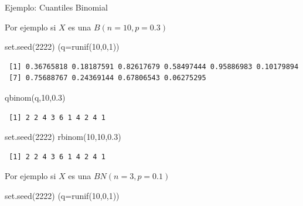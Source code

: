 \documentclass[
  letterpaper,
  DIV=11,
  numbers=noendperiod]{scrreprt}
\newenvironment{Shaded}{\begin{snugshade}}{\end{snugshade}}
\newcommand{\AttributeTok}[1]{\textcolor[rgb]{0.40,0.45,0.13}{#1}}
\newcommand{\DecValTok}[1]{\textcolor[rgb]{0.68,0.00,0.00}{#1}}
\newcommand{\FloatTok}[1]{\textcolor[rgb]{0.68,0.00,0.00}{#1}}
\newcommand{\FunctionTok}[1]{\textcolor[rgb]{0.28,0.35,0.67}{#1}}
\newcommand{\NormalTok}[1]{\textcolor[rgb]{0.00,0.23,0.31}{#1}}
\begin{document}
\begin{Ejemplo}{Ejemplo: Cuantiles Binomial}{}

Por ejemplo si \(X\) es una \(B(n=10,p=0.3)\)

\begin{Shaded}
\begin{Highlighting}[]
\FunctionTok{set.seed}\NormalTok{(}\DecValTok{2222}\NormalTok{)}
\NormalTok{(}\AttributeTok{q=}\FunctionTok{runif}\NormalTok{(}\DecValTok{10}\NormalTok{,}\DecValTok{0}\NormalTok{,}\DecValTok{1}\NormalTok{))}
\end{Highlighting}
\end{Shaded}

\begin{verbatim}
 [1] 0.36765818 0.18187591 0.82617679 0.58497444 0.95886983 0.10179894
 [7] 0.75688767 0.24369144 0.67806543 0.06275295
\end{verbatim}

\begin{Shaded}
\begin{Highlighting}[]
\FunctionTok{qbinom}\NormalTok{(q,}\DecValTok{10}\NormalTok{,}\FloatTok{0.3}\NormalTok{)}
\end{Highlighting}
\end{Shaded}

\begin{verbatim}
 [1] 2 2 4 3 6 1 4 2 4 1
\end{verbatim}

\begin{Shaded}
\begin{Highlighting}[]
\FunctionTok{set.seed}\NormalTok{(}\DecValTok{2222}\NormalTok{)}
\FunctionTok{rbinom}\NormalTok{(}\DecValTok{10}\NormalTok{,}\DecValTok{10}\NormalTok{,}\FloatTok{0.3}\NormalTok{)}
\end{Highlighting}
\end{Shaded}

\begin{verbatim}
 [1] 2 2 4 3 6 1 4 2 4 1
\end{verbatim}

Por ejemplo si \(X\) es una \(BN(n=3,p=0.1)\)

\begin{Shaded}
\begin{Highlighting}[]
\FunctionTok{set.seed}\NormalTok{(}\DecValTok{2222}\NormalTok{)}
\NormalTok{(}\AttributeTok{q=}\FunctionTok{runif}\NormalTok{(}\DecValTok{10}\NormalTok{,}\DecValTok{0}\NormalTok{,}\DecValTok{1}\NormalTok{))}
\end{Highlighting}
\end{Shaded}


\end{Ejemplo}
\end{document}
